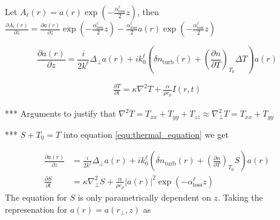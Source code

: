 \documentclass[a4paper, 12pt]{amsbook}
\begin{document}
Let $ A_\ell(r) = a(r) \exp{(-\frac{\alpha^\ell_\text{loss}}{2} z)}$, then $\frac{\partial A_\ell(r)}{\partial z} = \frac{\partial a(r) }{\partial z} \exp{(-\frac{\alpha^\ell_\text{loss}}{2} z)} - \frac{\alpha^\ell_\text{loss}}{2}  a(r) \exp{(-\frac{\alpha^\ell_\text{loss}}{2} z)} $


$$\frac{\partial a(r)}{\partial z} = \frac{i}{2k^\ell} \Delta_\perp a(r) + ik_0^\ell \left( \delta n_{\text{turb}}(r) + \left( \frac{\partial n}{\partial T} \right)_{T_0} \Delta T \right)a(r) $$



\begin{equation*}\label{equ:thermal_equation}
    \begin{aligned}
        \frac{\partial T}{\partial t} = \kappa \nabla^2 T + \frac{\alpha }{\rho c_\rho} I(r,t) 
    \end{aligned}
\end{equation*}

*** Arguments to justify that  $ \nabla^2 T = T_{xx} + T_{yy} + T_{zz} \approx  \nabla_{\perp}^2 T = T_{xx} + T_{yy}$

*** $S + T_0 = T$  into equation \ref{equ:thermal_equation} we get


\begin{equation*}
    \begin{aligned}
    \frac{\partial a(r)}{\partial z} &= \frac{i}{2k^\ell} \Delta_\perp a(r) + ik_0^\ell \left( \delta n_{\text{turb}}(r) + \left( \frac{\partial n}{\partial T} \right)_{T_0} S \right)a(r) \\
        \frac{\partial S}{\partial t} &= \kappa \nabla_{\perp}^2 S + \frac{\alpha }{\rho c_\rho} |a(r)|^2 \exp{(- \alpha^\ell_\text{loss} z)}
    \end{aligned}
\end{equation*}
The equation for $S$ is only parametrically dependent on $z$.  Taking the represenation for $a(r) = a(r_\perp,z)$ as
\end{document}
